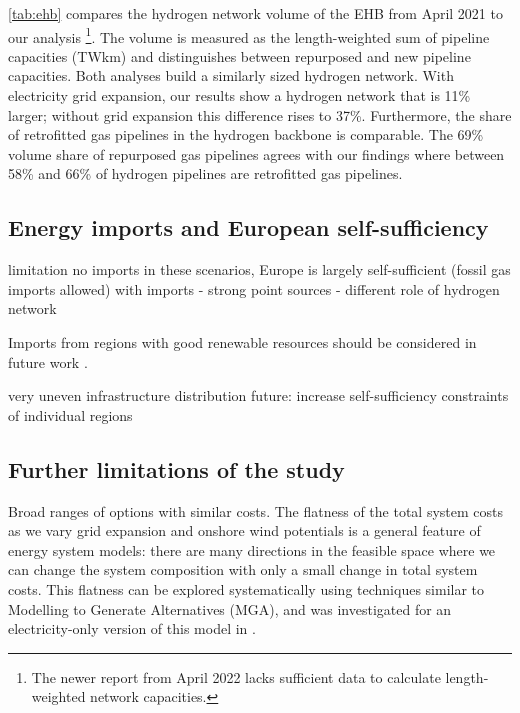 \cref{tab:ehb} compares the hydrogen network volume of the EHB from April 2021
to our analysis \cite{gasforclimateExtendingEuropean2021}\footnote{The newer
report from April 2022 \cite{gasforclimateEuropeanHydrogen2022} lacks sufficient
data to calculate length-weighted network capacities.}. The volume is measured
as the length-weighted sum of pipeline capacities (TWkm) and distinguishes
between repurposed and new pipeline capacities. Both analyses build a similarly
sized hydrogen network. With electricity grid expansion, our results show a
hydrogen network that is 11\% larger; without grid expansion this difference
rises to 37\%. Furthermore, the share of retrofitted gas pipelines in the
hydrogen backbone is comparable. The 69\% volume share of repurposed gas
pipelines \cite{gasforclimateExtendingEuropean2021} agrees with our findings
where between 58\% and 66\% of hydrogen pipelines are retrofitted gas pipelines.

\subsection*{Energy imports and European self-sufficiency}

limitation no imports
in these scenarios, Europe is largely self-sufficient (fossil gas imports allowed)
with imports
- strong point sources
- different role of hydrogen network

Imports from regions with good renewable
resources should be considered in future work
\cite{fasihiTechnoeconomicAssessment2019,heuserTechnoeconomicAnalysis2019}.

very uneven infrastructure distribution
future: increase self-sufficiency constraints of individual regions

\subsection*{Further limitations of the study}

Broad ranges of options with similar costs. The flatness of the total system
costs as we vary grid expansion and onshore wind potentials is a general feature
of energy system models: there are many directions in the feasible space where
we can change the system composition with only a small change in total system
costs. This flatness can be explored systematically using techniques similar to
Modelling to Generate Alternatives (MGA), and was investigated for an
electricity-only version of this model in \cite{Neumann2019}.

